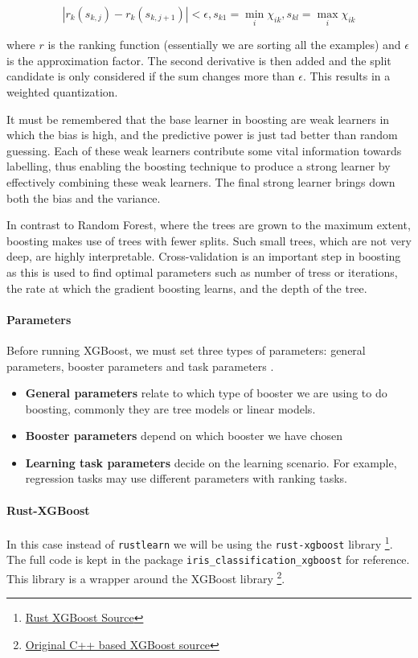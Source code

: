 \documentclass{book}
\begin{document}
\begin{equation}
	|r_k(s_{k, j}) - r_k(s_{k, j+1})| < \epsilon, s_{k1} = \min_i \chi_{ik}, s_{kl} = \max_i \chi_{ik}
\end{equation}

where $r$ is the ranking function (essentially we are sorting all the examples) and $\epsilon$ is the approximation factor. The second derivative is then added and the split candidate is only considered if the sum changes more than $\epsilon$. This results in a weighted quantization\cite{WEBSITE:10}.

It must be remembered that the base learner in boosting are weak learners in which the bias is high, and the predictive power is just tad better than random guessing. Each of these weak learners contribute some vital information towards labelling, thus enabling the boosting technique to produce a strong learner by effectively combining these weak learners. The final strong learner brings down both the bias and the variance.

In contrast to Random Forest, where the trees are grown to the maximum extent, boosting makes use of trees with fewer splits. Such small trees, which are not very deep, are highly interpretable. Cross-validation is an important step in boosting as this is used to find optimal parameters such as number of tress or iterations, the rate at which the gradient boosting learns, and the depth of the tree. 

\paragraph{Parameters}%
Before running XGBoost, we must set three types of parameters: general parameters, booster parameters and task parameters\cite{Chen:2016:XST:2939672.2939785} .

\begin{itemize}
	\item {\bf General parameters} relate to which type of booster we are using to do boosting, commonly they are tree models or linear models.
	\item {\bf Booster parameters} depend on which booster we have chosen
	\item {\bf Learning task parameters} decide on the learning scenario. For example, regression tasks may use different parameters with ranking tasks.
\end{itemize}
\label{par:parameters}

\paragraph{Rust-XGBoost}%
In this case instead of \lstinline{rustlearn} we will be using the \lstinline{rust-xgboost} library \footnote{\href{https://github.com/davechallis/rust-xgboost}{Rust XGBoost Source}}. The full code is kept in the package \lstinline{iris_classification_xgboost} for reference. This library is a wrapper around the XGBoost library \footnote{\href{https://github.com/dmlc/xgboost/}{Original C++ based XGBoost source}}.
\end{document}
